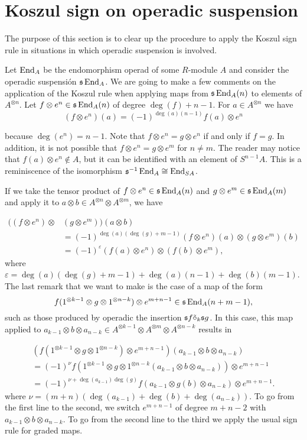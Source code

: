 \documentclass[Thesis.tex]{subfiles}
\begin{document}
\section{Koszul sign on operadic suspension}\label{koszulsigns}
The purpose of this section is to clear up the procedure to apply the Koszul sign rule in situations in which operadic suspension is involved.

Let $\operatorname{End}_A$ be the endomorphism operad of some $R$-module $A$ and consider the operadic suspensión $\mathfrak{s}\operatorname{End}_A$. We are going to make a few comments on the application of the Koszul rule when applying maps from $\mathfrak{s}\operatorname{End}_A(n)$ to elements of $A^{\otimes n}$. Let $f\otimes e^n\in\mathfrak{s}\operatorname{End}_A(n)$  of degree $\deg(f)+n-1$. %
For $a\in A^{\otimes n}$ we have \[(f\otimes e^n)(a)=(-1)^{\deg(a)(n-1)}f(a)\otimes e^n\]

because $\deg(e^n)=n-1$. Note that $f\otimes e^n=g\otimes e^n$ if and only if $f=g$. In addition, it is not possible that $f\otimes e^n=g\otimes e^m$ for $n\neq m$. %
The reader may notice that $f(a)\otimes  e^n\notin A$, but it can be identified with an element of $S^{n-1}A$. This is a reminiscence of the isomorphism $\mathfrak{s}^{-1}\operatorname{End}_A\cong \operatorname{End}_{SA}$. %
 

If we take the tensor product of $f\otimes e^n\in\mathfrak{s}\operatorname{End}_A(n)$ and $g\otimes e^m\in\mathfrak{s}\operatorname{End}_A(m)$ and apply it to $a\otimes b\in A^{\otimes n}\otimes A^{\otimes m}$, we have

\begin{align*}
((f\otimes e^n)\otimes &( g\otimes e^m))(a\otimes b)\\
&=(-1)^{\deg(a)(\deg(g)+m-1)}(f\otimes e^n)(a)\otimes( g\otimes e^m)(b)\\
&=(-1)^{\varepsilon}(f(a)\otimes e^n)\otimes(f(b)\otimes e^m),
\end{align*}
where $\varepsilon = \deg(a)(\deg(g)+m-1)+\deg(a)(n-1)+\deg(b)(m-1)$. 
The last remark that we want to make is the case of a map of the form 
\[f(1^{\otimes k-1}\otimes g\otimes 1^{\otimes n-k})\otimes e^{m+n-1}\in\mathfrak{s}\operatorname{End}_A(n+m-1),\] 
such as those produced by operadic the insertion $\mathfrak{s} f\tilde{\circ}_{k} \mathfrak{s} g$. In this case, this map applied to $a_{k-1}\otimes b\otimes a_{n-k}\in A^{\otimes k-1}\otimes A^{\otimes m}\otimes A
^{\otimes n-k}$ results in

\begin{gather*}
(f(1^{\otimes k-1}\otimes g\otimes 1^{\otimes n-k})\otimes e^{m+n-1})(a_{k-1}\otimes b\otimes a_{n-k})\\
=(-1)^{\nu}f(1^{\otimes k-1}\otimes g\otimes 1^{\otimes n-k}(a_{k-1}\otimes b\otimes a_{n-k}))\otimes e^{m+n-1}\\
=(-1)^{\nu+\deg(a_{k-1})\deg(g)}f(a_{k-1}\otimes g(b)\otimes a_{n-k})\otimes e^{m+n-1}.
\end{gather*}
where $\nu=(m+n)(\deg(a_{k-1})+\deg(b)+\deg(a_{n-k}))$.
To go from the first line to the second, we switch $e^{m+n-1}$ of degree $m+n-2$  with $a_{k-1}\otimes b\otimes a_{n-k}$. To go from the second line to the third we apply the usual sign rule for graded maps.
\end{document}
